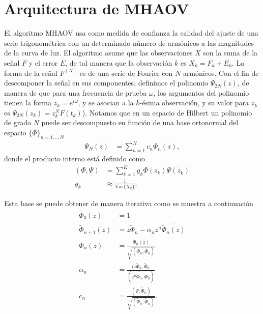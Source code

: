 \section{Arquitectura de MHAOV}\label{sec:arquitectura-mhaov}

El algoritmo MHAOV usa como medida de confianza la calidad del ajuste de una serie trigonométrica con un determinado número de armónicos a las magnitudes de la curva de luz. El algoritmo asume que las observaciones $X$ son la suma de la señal $F$ y el error $E$, de tal manera que la observación $k$ es $X_k= F_k+E_k$. La forma de la señal $F^{(N)}$ es de una serie de Fourier con $N$ armónicos. Con el fin de descomponer la señal en sus componentes, definimos el polinomio $\Psi_{2N}(z)$, de manera de que para una frecuencia de prueba $\omega$, los argumentos del polinomio tienen la forma $z_k = e^{i \omega}$, y se asocian a la $k$-ésima observación, y su valor para $z_k$  es $\Psi_{2N}(z_k)=z_k^N F(t_k)$). Notamos que en un espacio de Hilbert un polinomio de grado $N$ puede ser descompuesto en función de una base ortonormal del espacio $\{\Phi\}_{n=1,..,N}$
\begin{align}
    \Psi_N(z) &= \sum_{n=1}^{N} c_n \Phi_n(z)
,\end{align}
donde el producto interno está definido como
\begin{align}
    (\Phi, \Psi) &= \sum_{k=1}^{K} g_k \Phi(z_k) \overline {\Psi(z_k)} \label{eq:scalar-product}\\
    g_k &\approx \frac{1}{\mbox{Var}\{X_k\}} \nonumber 
.\end{align}

Esta base se puede obtener de manera iterativa como se muestra a continuación
\begin{align}
    \tilde{ \Phi }_0(z)  &= 1 \\
    \tilde{ \Phi }_{n+1}(z)  &= z \tilde{ \Phi}_n-\alpha_n z^n \overline{\tilde{\Phi}_n(z) } \label{eq:recurrence} \\ 
\Phi_n(z) &= \frac{\tilde{ \Phi}_n(z) }{\sqrt{(\tilde{\Phi}_n, \tilde{\Phi}_n)}}\\
\alpha_n &= \frac{(z\tilde{\Phi}_n, \tilde{\Phi}_n }{(z^n \overline{\tilde{\Phi}_n}, \tilde{\Phi}_n)} \label{eq:alpha} \\
c_n &= \frac{(\Psi, \tilde{\Phi}_n)}{\sqrt{(\tilde{\Phi}_n, \tilde{\Phi}_n)}} \label{eq:c}
.\end{align}

